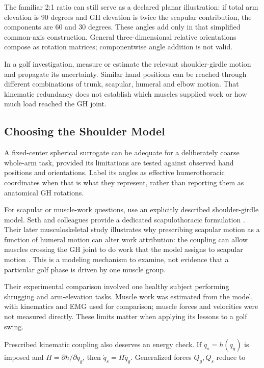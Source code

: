 The familiar 2:1 ratio can still serve as a declared planar illustration: if total arm elevation is 90 degrees and GH elevation is twice the scapular contribution, the components are 60 and 30 degrees. These angles add only in that simplified common-axis construction. General three-dimensional relative orientations compose as rotation matrices; componentwise angle addition is not valid.

In a golf investigation, measure or estimate the relevant shoulder-girdle motion and propagate its uncertainty. Similar hand positions can be reached through different combinations of trunk, scapular, humeral and elbow motion. That kinematic redundancy does not establish which muscles supplied work or how much load reached the GH joint.

\subsection{Choosing the Shoulder Model}\label{choosing-the-shoulder-model}

A fixed-center spherical surrogate can be adequate for a deliberately coarse whole-arm task, provided its limitations are tested against observed hand positions and orientations. Label its angles as effective humerothoracic coordinates when that is what they represent, rather than reporting them as anatomical GH rotations.

For scapular or muscle-work questions, use an explicitly described shoulder-girdle model. Seth and colleagues provide a dedicated scapulothoracic formulation \citep{Seth2016Scapula}. Their later musculoskeletal study illustrates why prescribing scapular motion as a function of humeral motion can alter work attribution: the coupling can allow muscles crossing the GH joint to do work that the model assigns to scapular motion \citep{Seth2019ShoulderWork}. This is a modeling mechanism to examine, not evidence that a particular golf phase is driven by one muscle group.

Their experimental comparison involved one healthy subject performing shrugging and arm-elevation tasks. Muscle work was estimated from the model, with kinematics and EMG used for comparison; muscle forces and velocities were not measured directly. These limits matter when applying its lessons to a golf swing.

Prescribed kinematic coupling also deserves an energy check. If \(q_s=h(q_g)\) is imposed and \(H=\partial h/\partial q_g\), then \(\dot q_s=H\dot q_g\). Generalized forces \(Q_g,Q_s\) reduce to

